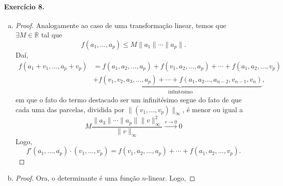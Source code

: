 \documentclass[12pt,a4paper]{article}
\newcommand{\R}{\mathbb{R}}
\begin{document}
\paragraph{Exercício 8.}
%
    \begin{enumerate}[a)]
        \item 
        \begin{proof}
            Analogamente ao caso de uma transformação linear, temos que $\exists M\in\R$ tal que
            \begin{equation*}
                f(a_1, \dots, a_p) \leq M\|a_1\|\cdots\|a_p\|.
            \end{equation*}
            Daí,
            \begin{align*}
                f(a_1 + v_1, \dots, a_p + v_p) &= f(a_1, a_2,\dots, a_p) 
                                               + f(v_1,a_2, \dots, a_p) 
                                               + \cdots 
                                               + f(a_1, a_2, \dots, v_p) \\
                                               &+ \underbrace{f(v_1, v_2, a_3, \dots, a_p) 
                                               + \cdots 
                                               + f(a_1, a_2\dots, a_{n-2}, v_{n-1}, v_n)}_{\text{infinitésimo}},
            \end{align*}
            em que o fato do termo destacado ser um infinitésimo segue do fato de que cada uma das parcelas,
            dividida por $\|(v_1, \dots, v_p)\|_{\infty}$, é menor ou igual a
            \begin{equation*}
                M\frac{\|a_3\|\cdots\|a_p\|\|v\|^2_{\infty}}{\|v\|_{\infty}} \xrightarrow{v\to 0} 0
            \end{equation*}
            Logo, 
            \begin{equation*}
                f'(a_1, \dots, a_p)\cdot (v_1, \dots, v_p) = f(v_1, a_2, \dots, a_p) 
                                                           + \cdots 
                                                           + f(a_1, a_2, \dots, v_p).
            \end{equation*}
        \end{proof}
        \item
        \begin{proof}
            Ora, o determinante é uma função $n$-linear. Logo, 

\end{proof}
\end{enumerate}
\end{document}
